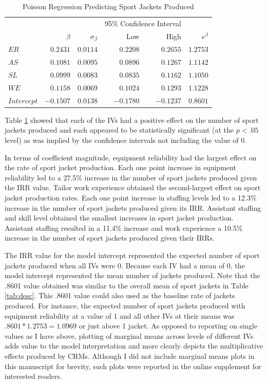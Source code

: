 \documentclass[man]{apa7}
\begin{document}
	\begin{table}[h!]
		\centering
		\caption{\centering Poisson Regression Predicting Sport Jackets Produced} 
		\begin{tabular}{l|rrrrr}
			\hline 
			\multicolumn{1}{l}{} &  &  & \multicolumn{2}{c}{95\% Confidence Interval} &   \\ 
			\multicolumn{1}{l}{} & $\beta$ & $\sigma_{\beta}$ & Low & High & $e^{\beta}$ \\ 
			\hline 
			$ER$ & $0.2431$ & $0.0114$ & $0.2208$ & $0.2655$ & $1.2753$ \\  
			$AS$ & $0.1081$ & $0.0095$ & $0.0896$ & $0.1267$ & $1.1142$ \\ 
			$SL$ & $0.0999$ & $0.0083$ & $0.0835$ & $0.1162$ & $1.1050$ \\
			$WE$ & $0.1158$ & $0.0069$ & $0.1024$ & $0.1293$ & $1.1228$ \\ 
			$Intercept$ & $-0.1507$ & $0.0138$ & $-0.1780$ & $-0.1237$ & $0.8601$ \\
			\hline 
		\end{tabular}
		\label{tab:poisreg}
	\end{table}
	
	Table \ref{tab:poisreg} showed that each of the IVs had a positive effect on the number of sport jackets produced and each appeared to be statistically significant (at the $p < .05$ level) as was implied by the confidence intervals not including the value of 0.
	
	In terms of coefficient magnitude, equipment reliability had the largest effect on the rate of sport jacket production. 
	Each one point increase in equipment reliability led to a 27.5\% increase in the number of sport jackets produced given the IRR value.
	Tailor work experience obtained the second-largest effect on sport jacket production rates.
	Each one point increase in staffing levels led to a 12.3\% increase in the number of sport jackets produced given its IRR.
	Assistant staffing and skill level obtained the smallest increases in sport jacket production.
	Assistant staffing resulted in a 11.4\% increase and work experience a 10.5\% increase in the number of sport jackets produced given their IRRs. 
	
	The IRR value for the model intercept represented the expected number of sport jackets produced when all IVs were 0.
	Because each IV had a mean of 0, the model intercept represented the mean number of jackets produced. 
	Note that the .8601 value obtained was similar to the overall mean of sport jackets in Table \ref{tab:desc}.
	This .8601 value could also used as the baseline rate of jackets produced.
	For instance, the expected number of sport jackets produced with equipment reliability at a value of 1 and all other IVs at their means was $.8601*1.2753 = 1.0969$ or just above 1 jacket.
	As opposed to reporting on single values as I have above, plotting of marginal means across levels of different IVs adds value to the model interpretation \parencite[see][for a similar perspective]{ronkko2022eight} and more clearly depicts the multiplicative effects produced by CRMs.
	Although I did not include marginal means plots in this manuscript for brevity, such plots were reported in the online supplement for interested readers.
	
\end{document}

